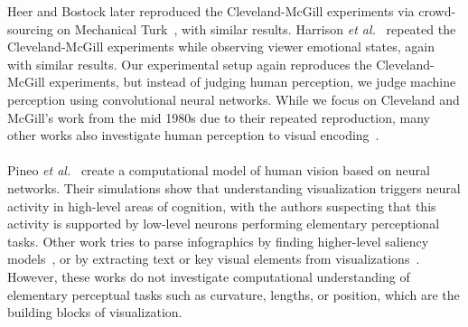 Heer and Bostock later reproduced the Cleveland-McGill experiments via crowd-sourcing on Mechanical Turk~\cite{HeerBostock2010}, with similar results. Harrison \textit{et al.}~\cite{harrison2013influencing} repeated the Cleveland-McGill experiments while observing viewer emotional states, again with similar results. Our experimental setup again reproduces the Cleveland-McGill experiments, but instead of judging human perception, we judge machine perception using convolutional neural networks. While we focus on Cleveland and McGill's work from the mid 1980s due to their repeated reproduction, many other works also investigate human perception to visual encoding~\cite{mackinlay1988applying,bertin1967semiologie,treisman1988feature,carpendale2003considering,wilkinson2006grammar,widgor_perception2007,munzner2015visualization}.
%
%
\\~\\
 Pineo \textit{et al.}~\cite{Pineo2012_computational_perception} create a computational model of human vision based on neural networks. Their simulations show that understanding visualization triggers neural activity in high-level areas of cognition, with the authors suspecting that this activity is supported by low-level neurons performing elementary perceptional tasks. Other work tries to parse infographics by finding higher-level saliency models~\cite{bylinskii2016should}, or by extracting text or key visual elements from visualizations~\cite{diagram_understanding,kembhavi2016diagram,zoya_text_visual_tags}. However, these works do not investigate computational understanding of elementary perceptual tasks such as curvature, lengths, or position, which are the building blocks of visualization.

